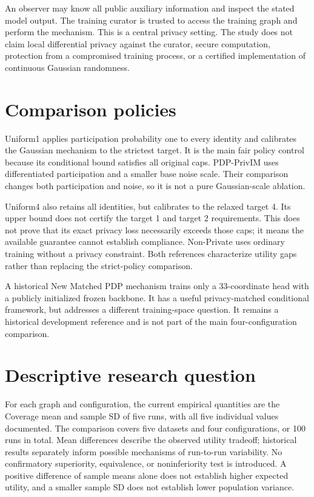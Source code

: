 An observer may know all public auxiliary information and inspect the stated model output. The training curator is trusted to access the training graph and perform the mechanism. This is a central privacy setting. The study does not claim local differential privacy against the curator, secure computation, protection from a compromised training process, or a certified implementation of continuous Gaussian randomness.

\section{Comparison policies}
Uniform1 applies participation probability one to every identity and calibrates the Gaussian mechanism to the strictest target. It is the main fair policy control because its conditional bound satisfies all original caps. PDP-PrivIM uses differentiated participation and a smaller base noise scale. Their comparison changes both participation and noise, so it is not a pure Gaussian-scale ablation.

Uniform4 also retains all identities, but calibrates to the relaxed target 4. Its upper bound does not certify the target 1 and target 2 requirements. This does not prove that its exact privacy loss necessarily exceeds those caps; it means the available guarantee cannot establish compliance. Non-Private uses ordinary training without a privacy constraint. Both references characterize utility gaps rather than replacing the strict-policy comparison.

A historical New Matched PDP mechanism trains only a 33-coordinate head with a publicly initialized frozen backbone. It has a useful privacy-matched conditional framework, but addresses a different training-space question. It remains a historical development reference and is not part of the main four-configuration comparison.

\section{Descriptive research question}
For each graph and configuration, the current empirical quantities are the Coverage mean and sample SD of five runs, with all five individual values documented. The comparison covers five datasets and four configurations, or 100 runs in total. Mean differences describe the observed utility tradeoff; historical results separately inform possible mechanisms of run-to-run variability. No confirmatory superiority, equivalence, or noninferiority test is introduced. A positive difference of sample means alone does not establish higher expected utility, and a smaller sample SD does not establish lower population variance.

